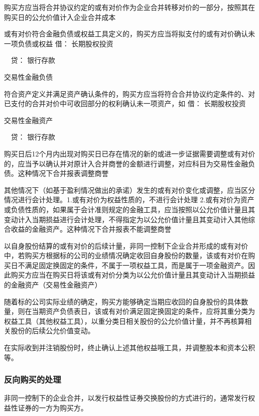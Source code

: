 \documentclass[UTF8,12pt]{ctexart}
\newenvironment{Dr}{\noindent 借：}{\par}
\newenvironment{Cr}{\noindent \ \ 贷：}{\par}
\numberwithin{equation}{section} %
\numberwithin{figure}{section}
\numberwithin{table}{section}
\begin{document}
	购买方应当将合并协议约定的或有对价作为企业合并转移对价的一部分，按照其在购买日的公允价值计入企业合并成本
	
	或有对价符合金融负债或权益工具定义的，购买方应当将拟支付的或有对价确认未一项负债或权益
	\begin{Dr}
		长期股权投资
	\end{Dr}
	\begin{Cr}
		银行存款
		
		交易性金融负债
	\end{Cr}
	
	符合资产定义并满足资产确认条件的，购买方应当将符合合并协议约定条件的、对已支付的合并对价中可收回部分的权利确认未一项资产，如
	\begin{Dr}
		长期股权投资
		
		交易性金融资产
	\end{Dr}
	\begin{Cr}
		银行存款
	\end{Cr}
	
	
	购买日后12个月内出现对购买日已存在情况的新的或进一步证据需要调整或有对价的，应当予以确认并对原计入合并商誉的金额进行调整，对应科目为交易性金融负债。这种情况下合并报表调整商誉
	
	其他情况下（如基于盈利情况做出的承诺）发生的或有对价变化或调整，应当区分情况进行会计处理。1.或有对价为权益性质的，不进行会计处理
	2.或有对价为资产或负债性质的，如果属于会计准则规定的金融工具，应当按照以公允价值计量且其变动计入当期损益进行会计处理，不得指定为以公允价值计量且其变动计入其他综合收益的金融资产。这种情况下合并报表不能调整商誉
	
	以自身股份结算的或有对价的后续计量，非同一控制下企业合并形成的或有对价中，若购买方根据标的公司的业绩情况确定收回自身股份的数量，该或有对价在购买日不满足固定换固定的条件，不属于一项权益工具，而是属于一项金融资产。因此购买方应当在购买日将该或有对价分类为以公允价值计量且其变动计入当期损益的金融资产（交易性金融资产）
	
	随着标的公司实际业绩的确定，购买方能够确定当期应收回的自身股份的具体数量，则在当期资产负债表日，该或有对价满足固定换固定的条件，应将其重分类为权益工具（其他权益工具），以重分类日相关股份的公允价值计量，并不再核算相关股份的后续公允价值变动。
	
	在实际收到并注销股份时，终止确认上述其他权益哦工具，并调整股本和资本公积等。
	\subsubsection{反向购买的处理}
	非同一控制下的企业合并，以发行权益性证券交换股份的方式进行的，通常发行权益性证券的一方为购买方。
	
\end{document}
